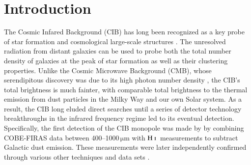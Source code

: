 \documentclass{aa}
\newcommand{\mathsc}[1]{{\normalfont\textsc{#1}}}
\newcommand{\hi}{\ensuremath{\mathsc {H\ i}}}
\begin{document}

   \maketitle

   \setcounter{tocdepth}{2}
   \tableofcontents


\section{Introduction}

The Cosmic Infared Background (CIB) has long been recognized as a key probe of star formation and cosmological large-scale structures \citep{partridge1967}. The unresolved radiation from distant galaxies can be used to probe both the total number density of galaxies at the peak of star formation as well as their clustering properties. Unlike the Cosmic Microwave Background (CMB), whose serendipitous discovery was due to its high photon number density \citep{penzias:1965}, the CIB's total brightness is much fainter, with comparable total brightness to the thermal emission from dust particles in the Milky Way and our own Solar system. As a result, the CIB long eluded direct searches until a series of detector technology breakthroughs in the infrared frequency regime led to its eventual detection. Specifically, the first detection of the CIB monopole was made by \citet{puget1996} by combining COBE-FIRAS data between 400--1000\,$\mathrm{\mu m}$ with \hi\ measurements to subtract Galactic dust emission. These measurements were later independently confirmed through various other techniques and data sets \citep[e.g.,][]{fixsen1998, schlegel1998, lagache:1999, penin:2012}. 
\end{document}
